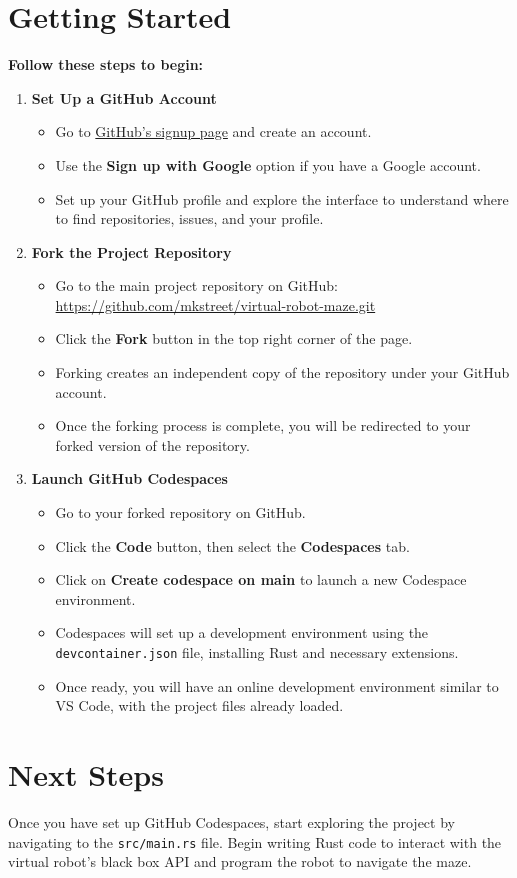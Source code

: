 \documentclass{article}
\begin{document}
	\section*{Getting Started}
	\textbf{Follow these steps to begin:}
	\begin{enumerate}
		\item \textbf{Set Up a GitHub Account}
		\begin{itemize}
			\item Go to \href{https://github.com/}{GitHub's signup page} and create an account.
			\item Use the \textbf{Sign up with Google} option if you have a Google account.
			\item Set up your GitHub profile and explore the interface to understand where to find repositories, issues, and your profile.
		\end{itemize}
		
		\item \textbf{Fork the Project Repository}
		\begin{itemize}
			\item Go to the main project repository on GitHub: \\
			\url{https://github.com/mkstreet/virtual-robot-maze.git}
			\item Click the \textbf{Fork} button in the top right corner of the page.
			\item Forking creates an independent copy of the repository under your GitHub account.
			\item Once the forking process is complete, you will be redirected to your forked version of the repository.
		\end{itemize}
		
		\item \textbf{Launch GitHub Codespaces}
		\begin{itemize}
			\item Go to your forked repository on GitHub.
			\item Click the \textbf{Code} button, then select the \textbf{Codespaces} tab.
			\item Click on \textbf{Create codespace on main} to launch a new Codespace environment.
			\item Codespaces will set up a development environment using the \texttt{devcontainer.json} file, installing Rust and necessary extensions.
			\item Once ready, you will have an online development environment similar to VS Code, with the project files already loaded.
		\end{itemize}
	\end{enumerate}
	
	\section*{Next Steps}
	Once you have set up GitHub Codespaces, start exploring the project by navigating to the \texttt{src/main.rs} file. Begin writing Rust code to interact with the virtual robot's black box API and program the robot to navigate the maze.
	
\end{document}
